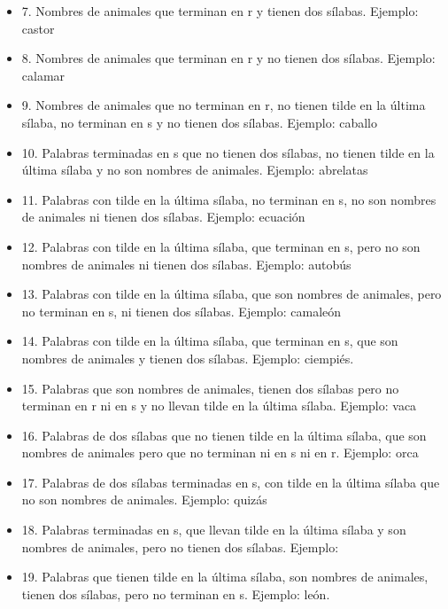 \documentclass[12pt]{article}
\theoremstyle{definition}
\theoremstyle{remark}
\begin{document}
\begin{enumerate}
\begin{itemize}
		\item 7. Nombres de animales que terminan en r y tienen dos sílabas. Ejemplo: castor
		\item 8. Nombres de animales que terminan en r y no tienen dos sílabas. Ejemplo: calamar
		\item  9. Nombres de animales que no terminan en r, no tienen tilde en la última sílaba, no terminan en s y no tienen dos sílabas. Ejemplo: caballo
		\item 10. Palabras terminadas en s que no tienen dos sílabas, no tienen tilde en la última sílaba y no son nombres de animales. Ejemplo: abrelatas
		\item 11. Palabras con tilde en la última sílaba, no terminan en s, no son nombres de animales ni tienen dos sílabas. Ejemplo: ecuación
		\item 12. Palabras con tilde en la última sílaba, que terminan en s, pero no son nombres de animales ni tienen dos sílabas. Ejemplo: autobús
		\item 13. Palabras con tilde en la última sílaba, que son nombres de animales, pero no terminan en s, ni tienen dos sílabas. Ejemplo: camaleón
		\item 14. Palabras con tilde en la última sílaba, que terminan en s, que son nombres de animales y tienen dos sílabas. Ejemplo: ciempiés.
		\item 15. Palabras que son nombres de animales, tienen dos sílabas pero no terminan en r ni en s y no llevan tilde en la última sílaba. Ejemplo: vaca
		\item 16. Palabras de dos sílabas que no tienen tilde en la última sílaba, que son nombres de animales pero que no terminan ni en s ni en r. Ejemplo: orca
		\item 17. Palabras de dos sílabas terminadas en s, con tilde en la última sílaba que no son nombres de animales. Ejemplo: quizás
		\item 18. Palabras terminadas en s, que llevan tilde en la última sílaba y son nombres de animales, pero no tienen dos sílabas. Ejemplo:
		\item 19. Palabras que tienen tilde en la última sílaba, son nombres de animales, tienen dos sílabas, pero no terminan en s. Ejemplo: león.
		\end{itemize}


\end{enumerate}
\end{document}
